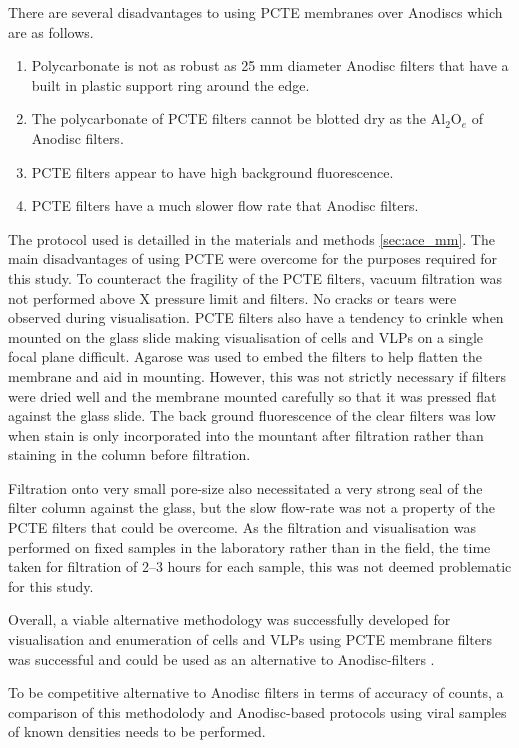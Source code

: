 There are several disadvantages to using \ac{PCTE} membranes over Anodiscs which are as follows.
\begin{enumerate}
\item Polycarbonate is not as robust as 25 mm diameter Anodisc filters that have a built in plastic support ring around the edge.
\item The polycarbonate of \ac{PCTE} filters cannot be blotted dry as the Al$_{2}$O$_{e}$ of Anodisc filters.
\item \ac{PCTE} filters appear to have high background fluorescence. %
\item \ac{PCTE} filters have a much slower flow rate that Anodisc filters. %
\end{enumerate}

The protocol used is detailled in the materials and methods \ref{sec:ace_mm}.
The main disadvantages of using \ac{PCTE} were overcome for the purposes required for this study.
To counteract the fragility of the \ac{PCTE} filters, vacuum filtration was not performed above X pressure limit and filters.
No cracks or tears were observed during visualisation.
\ac{PCTE} filters also have a tendency to crinkle when mounted on the glass slide making visualisation of cells and \acp{VLP} on a single focal plane difficult.
Agarose was used to embed the filters to help flatten the membrane and aid in mounting.
However, this was not strictly necessary if filters were dried well and the membrane mounted carefully so that it was pressed flat against the glass slide.
The back ground fluorescence of the clear filters was low when stain is only incorporated into the mountant after filtration rather than staining in the column before filtration.

Filtration onto very small pore-size also necessitated a very strong seal of the filter column against the glass, but the slow flow-rate was not a property of the \ac{PCTE} filters that could be overcome.
As the filtration and visualisation was performed on fixed samples in the laboratory rather than in the field, the time taken for filtration of 2--3 hours for each sample, this was not deemed problematic for this study.


Overall, a viable alternative methodology was successfully developed for visualisation and enumeration of cells and \acp{VLP} using \ac{PCTE} membrane filters was successful and could be used as an alternative to Anodisc-filters .

To be competitive alternative to Anodisc filters in terms of accuracy of counts, a comparison of this methodolody and Anodisc-based protocols using viral samples of known densities needs to be performed.

